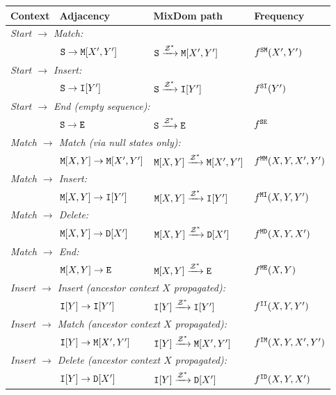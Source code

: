 \medskip
\begin{tabular}{llll}
Context & Adjacency & MixDom path & Frequency \\
\hline
\multicolumn{4}{l}{\emph{Start $\to$ Match:}} \\
& ${\tt S} \to {\tt M}[X',Y']$ &
${\tt S} \xrightarrow{\mathcal{Z}^\ast} {\tt M}[X',Y']$ &
$f^{{\tt S}{\tt M}}(X',Y')$ \\
\multicolumn{4}{l}{\emph{Start $\to$ Insert:}} \\
& ${\tt S} \to {\tt I}[Y']$ &
${\tt S} \xrightarrow{\mathcal{Z}^\ast} {\tt I}[Y']$ &
$f^{{\tt S}{\tt I}}(Y')$ \\
\multicolumn{4}{l}{\emph{Start $\to$ End (empty sequence):}} \\
& ${\tt S} \to {\tt E}$ &
${\tt S} \xrightarrow{\mathcal{Z}^\ast} {\tt E}$ &
$f^{{\tt S}{\tt E}}$ \\
\hline
\multicolumn{4}{l}{\emph{Match $\to$ Match (via null states only):}} \\
& ${\tt M}[X,Y] \to {\tt M}[X',Y']$ &
${\tt M}[X,Y] \xrightarrow{\mathcal{Z}^\ast} {\tt M}[X',Y']$ &
$f^{{\tt M}{\tt M}}(X,Y,X',Y')$ \\
\multicolumn{4}{l}{\emph{Match $\to$ Insert:}} \\
& ${\tt M}[X,Y] \to {\tt I}[Y']$ &
${\tt M}[X,Y] \xrightarrow{\mathcal{Z}^\ast} {\tt I}[Y']$ &
$f^{{\tt M}{\tt I}}(X,Y,Y')$ \\
\multicolumn{4}{l}{\emph{Match $\to$ Delete:}} \\
& ${\tt M}[X,Y] \to {\tt D}[X']$ &
${\tt M}[X,Y] \xrightarrow{\mathcal{Z}^\ast} {\tt D}[X']$ &
$f^{{\tt M}{\tt D}}(X,Y,X')$ \\
\multicolumn{4}{l}{\emph{Match $\to$ End:}} \\
& ${\tt M}[X,Y] \to {\tt E}$ &
${\tt M}[X,Y] \xrightarrow{\mathcal{Z}^\ast} {\tt E}$ &
$f^{{\tt M}{\tt E}}(X,Y)$ \\
\hline
\multicolumn{4}{l}{\emph{Insert $\to$ Insert (ancestor context $X$ propagated):}} \\
& ${\tt I}[Y] \to {\tt I}[Y']$ &
${\tt I}[Y] \xrightarrow{\mathcal{Z}^\ast} {\tt I}[Y']$ &
$f^{{\tt I}{\tt I}}(X,Y,Y')$ \\
\multicolumn{4}{l}{\emph{Insert $\to$ Match (ancestor context $X$ propagated):}} \\
& ${\tt I}[Y] \to {\tt M}[X',Y']$ &
${\tt I}[Y] \xrightarrow{\mathcal{Z}^\ast} {\tt M}[X',Y']$ &
$f^{{\tt I}{\tt M}}(X,Y,X',Y')$ \\
\multicolumn{4}{l}{\emph{Insert $\to$ Delete (ancestor context $X$ propagated):}} \\
& ${\tt I}[Y] \to {\tt D}[X']$ &
${\tt I}[Y] \xrightarrow{\mathcal{Z}^\ast} {\tt D}[X']$ &
$f^{{\tt I}{\tt D}}(X,Y,X')$ \\

\end{tabular}
